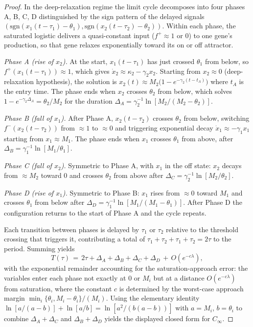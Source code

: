 \documentclass[10pt,a4paper]{amsart}
\begin{document}
\begin{proof}
In the deep-relaxation regime the limit cycle decomposes into four
phases A, B, C, D distinguished by the sign pattern of the delayed
signals
$(\mathrm{sgn}(x_1(t-\tau_1)-\theta_1),
  \mathrm{sgn}(x_2(t-\tau_2)-\theta_2))$. Within each phase, the
saturated logistic delivers a quasi-constant input ($f^+\approx 1$ or
$0$) to one gene's production, so that gene relaxes exponentially
toward its on or off attractor.

\emph{Phase A (rise of $x_2$).} At the start, $x_1(t-\tau_1)$ has just
crossed $\theta_1$ from below, so $f^+(x_1(t-\tau_1))\approx 1$, which
gives $\dot{x}_2 \approx \kappa_2-\gamma_2 x_2$. Starting from
$x_2\approx 0$ (deep-relaxation hypothesis), the solution is
$x_2(t)\approx M_2\bigl(1-e^{-\gamma_2(t-t_A)}\bigr)$ where $t_A$ is the
entry time. The phase ends when $x_2$ crosses $\theta_2$ from below,
which solves $1-e^{-\gamma_2\Delta_A} = \theta_2/M_2$ for the duration
$\Delta_A=\gamma_2^{-1}\ln[M_2/(M_2-\theta_2)]$.

\emph{Phase B (fall of $x_1$).} After Phase A, $x_2(t-\tau_2)$ crosses
$\theta_2$ from below, switching $f^-(x_2(t-\tau_2))$ from $\approx 1$
to $\approx 0$ and triggering exponential decay
$\dot{x}_1\approx -\gamma_1 x_1$ starting from $x_1\approx M_1$. The
phase ends when $x_1$ crosses $\theta_1$ from above, after
$\Delta_B=\gamma_1^{-1}\ln[M_1/\theta_1]$.

\emph{Phase C (fall of $x_2$).} Symmetric to Phase A, with $x_1$ in the
off state: $x_2$ decays from $\approx M_2$ toward $0$ and crosses
$\theta_2$ from above after $\Delta_C=\gamma_2^{-1}\ln[M_2/\theta_2]$.

\emph{Phase D (rise of $x_1$).} Symmetric to Phase B: $x_1$ rises from
$\approx 0$ toward $M_1$ and crosses $\theta_1$ from below after
$\Delta_D=\gamma_1^{-1}\ln[M_1/(M_1-\theta_1)]$. After Phase D the
configuration returns to the start of Phase A and the cycle repeats.

Each transition between phases is delayed by $\tau_1$ or $\tau_2$
relative to the threshold crossing that triggers it, contributing a
total of $\tau_1+\tau_2+\tau_1+\tau_2 = 2\tau$ to the period.
Summing yields
\begin{equation*}
T(\tau) \,=\, 2\tau + \Delta_A + \Delta_B + \Delta_C + \Delta_D
\,+\, O(e^{-c\lambda}),
\end{equation*}
with the exponential remainder accounting for the
saturation-approach error: the variables enter each phase not exactly
at $0$ or $M_i$ but at a distance $O(e^{-c\lambda})$ from saturation,
where the constant $c$ is determined by the worst-case approach margin
$\min_i\{\theta_i,M_i-\theta_i\}/(M_i)$. Using the elementary identity
$\ln[a/(a-b)]+\ln[a/b]=\ln[a^2/(b(a-b))]$ with $a=M_i$, $b=\theta_i$
to combine $\Delta_A+\Delta_C$ and $\Delta_B+\Delta_D$ yields the
displayed closed form for $C_\infty$.
\end{proof}
\end{document}
